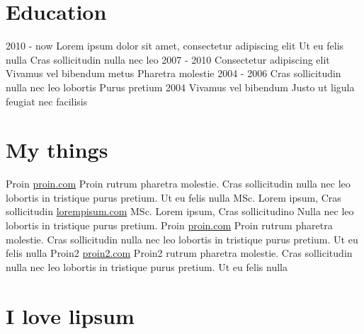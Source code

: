 \documentclass[]{viccuad-cv}
\begin{document}
\section{Education}
    \begin{entrylistdated}
      \entrydated
        {2010 - now}
        {Lorem ipsum dolor sit amet, consectetur adipiscing elit}
        {Ut eu felis nulla}
        {Cras sollicitudin nulla nec leo}
      \entrydated
        {2007 - 2010}
        {Consectetur adipiscing elit}
        {Vivamus vel bibendum metus}
        {Pharetra molestie}
      \entrydated
        {2004 - 2006}
        {Cras sollicitudin nulla nec leo lobortis}
        {}
        {Purus pretium} 
      \entrydated
        {2004}
        {Vivamus vel bibendum}
        {Justo ut ligula feugiat nec facilisis}
        {}
    \end{entrylistdated}

\section{My things}
    \begin{entrylist}
      \entry
        {Proin}
        {\href{https://proin.com}{proin.com}}
        {Proin rutrum pharetra molestie. Cras sollicitudin nulla nec leo lobortis in tristique purus pretium. Ut eu felis nulla}
      \entry
        {MSc. Lorem ipsum, Cras sollicitudin}
        {\href{http://loremipsum.com}{lorempisum.com}}
        {}
      \entry
        {MSc. Lorem ipsum, Cras sollicitudino}
        {}
        {Nulla nec leo lobortis in tristique purus pretium.}
      \entry
        {Proin}
        {\href{https://proin.com}{proin.com}}
        {Proin rutrum pharetra molestie. Cras sollicitudin nulla nec leo lobortis in tristique purus pretium. Ut eu felis nulla}
      \entry
        {Proin2}
        {\href{https://proin2.com}{proin2.com}}
        {Proin2 rutrum pharetra molestie. Cras sollicitudin nulla nec leo lobortis in tristique purus pretium. Ut eu felis nulla}
    \end{entrylist}







\framebreak

\section{I love lipsum}
\end{document}
